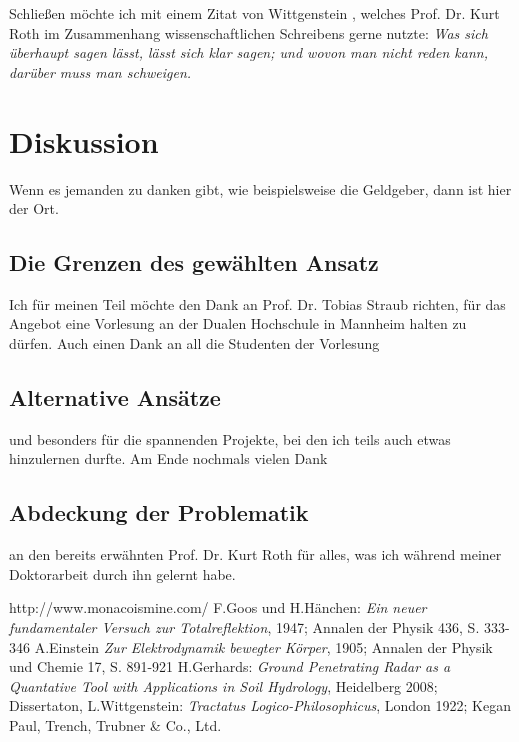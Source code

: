 \documentclass[10pt,twocolumn]{scrartcl}
\begin{document}
Schließen möchte ich mit einem Zitat von Wittgenstein \cite{Wittgenstein1922},
welches Prof. Dr. Kurt Roth im Zusammenhang wissenschaftlichen
Schreibens gerne nutzte: {\it Was sich überhaupt sagen lässt, lässt
sich klar sagen; und wovon man nicht reden kann, darüber muss man
schweigen.} 

\section{Diskussion}

Wenn es jemanden zu danken gibt, wie beispielsweise die Geldgeber, 
dann ist hier der Ort.

\subsection{Die Grenzen des gewählten Ansatz}

Ich für meinen Teil möchte den Dank an Prof. Dr. Tobias Straub
richten, für das Angebot eine Vorlesung an der Dualen Hochschule in
Mannheim halten zu dürfen. Auch einen Dank an all die Studenten der Vorlesung

\subsection{Alternative Ansätze}

und besonders für die spannenden Projekte, bei den ich teils auch 
etwas hinzulernen durfte. Am Ende nochmals vielen Dank 

\subsection{Abdeckung der Problematik}

an den bereits erwähnten Prof. Dr. Kurt Roth für alles, 
was ich während meiner Doktorarbeit durch ihn gelernt habe.

\begin{thebibliography}{99}
http://www.monacoismine.com/
F.Goos und H.Hänchen: {\it Ein neuer fundamentaler Versuch zur Totalreflektion}, 1947; Annalen der Physik 436, S. 333-346
A.Einstein {\it Zur Elektrodynamik bewegter Körper}, 1905; Annalen der Physik und Chemie 17, S. 891-921
H.Gerhards: {\it Ground Penetrating Radar as a Quantative Tool with Applications in Soil Hydrology}, Heidelberg 2008; Dissertaton,
L.Wittgenstein: {\it Tractatus Logico-Philo\-so\-phi\-cus}, London 1922; Kegan Paul, Trench, Trubner \& Co., Ltd.
\end{thebibliography}
\end{document}
